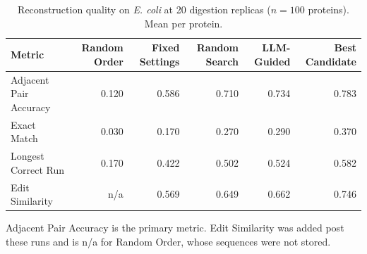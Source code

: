 \begin{table}[!tb]
  \centering
  \caption{Reconstruction quality on \textnormal{\textnormal{\textit{E. coli}}} at 20 digestion replicas ($n=100$ proteins). Mean per protein.}
  \label{tab:main_results_ecoli_r20}
  \begin{tabular}{lrrrrr}
    \toprule
    Metric & Random Order & Fixed Settings & Random Search & LLM-Guided & Best Candidate \\
    \midrule
    Adjacent Pair Accuracy & 0.120 & 0.586 & 0.710 & 0.734 & 0.783 \\
    Exact Match & 0.030 & 0.170 & 0.270 & 0.290 & 0.370 \\
    Longest Correct Run & 0.170 & 0.422 & 0.502 & 0.524 & 0.582 \\
    Edit Similarity & n/a & 0.569 & 0.649 & 0.662 & 0.746 \\
    \bottomrule
  \end{tabular}
  \par\smallskip\footnotesize{Adjacent Pair Accuracy is the primary metric. Edit Similarity was added post these runs and is n/a for Random Order, whose sequences were not stored.}
\end{table}
